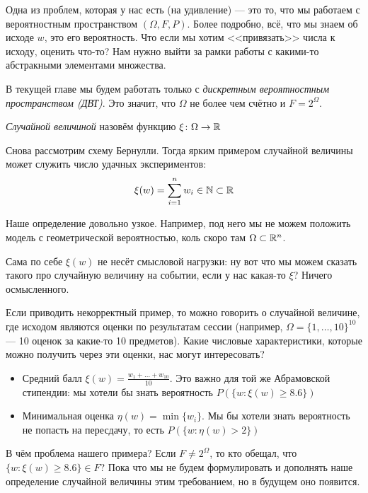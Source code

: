 \begin{note}
	Одна из проблем, которая у нас есть (на удивление) --- это то, что мы работаем с вероятностным пространством $(\Omega, F, P)$. Более подробно, всё, что мы знаем об исходе $w$, это его вероятность. Что если мы хотим <<привязать>> числа к исходу, оценить что-то? Нам нужно выйти за рамки работы с какими-то абстракными элементами множества.
\end{note}

\begin{note}
	В текущей главе мы будем работать только с \textit{дискретным вероятностным пространством (ДВТ)}. Это значит, что $\Omega$ не более чем счётно и $F = 2^\Omega$.
\end{note}

\begin{definition}
	\textit{Случайной величиной} назовём функцию $\xi \colon \Omega \to \mathbb{R}$
\end{definition}

\begin{example}
	Снова рассмотрим схему Бернулли. Тогда ярким примером случайной величины может служить число удачных экспериментов:
	\[
		\xi(w) = \sum_{i = 1}^n w_i \in \mathbb{N} \subset \mathbb{R}
	\]
\end{example}

\begin{note}
	Наше определение довольно узкое. Например, под него мы не можем положить модель с геометрической вероятностью, коль скоро там $\Omega \subset \mathbb{R}^n$.
\end{note}

\begin{note}
	Сама по себе $\xi(w)$ не несёт смысловой нагрузки: ну вот что мы можем сказать такого про случайную величину на событии, если у нас какая-то $\xi$? Ничего осмысленного.
	
	Если приводить некорректный пример, то можно говорить о случайной величине, где исходом являются оценки по результатам сессии (например, $\Omega = \{1, \ldots, 10\}^{10}$ --- 10 оценок за какие-то 10 предметов). Какие числовые характеристики, которые можно получить через эти оценки, нас могут интересовать?
	\begin{itemize}
		\item Средний балл $\xi(w) = \frac{w_1 + \ldots + w_{10}}{10}$. Это важно для той же Абрамовской стипендии: мы хотели бы знать вероятность $P(\{w \colon \xi(w) \ge 8.6\})$
		
		\item Минимальная оценка $\eta(w) = \min\{w_i\}$. Мы бы хотели знать вероятность не попасть на пересдачу, то есть $P(\{w \colon \eta(w) > 2\})$
	\end{itemize}
	В чём проблема нашего примера? Если $F \neq 2^\Omega$, то кто обещал, что $\{w \colon \xi(w) \ge 8.6\} \in F$? Пока что мы не будем формулировать и дополнять наше определение случайной величины этим требованием, но в будущем оно появится.
\end{note}

